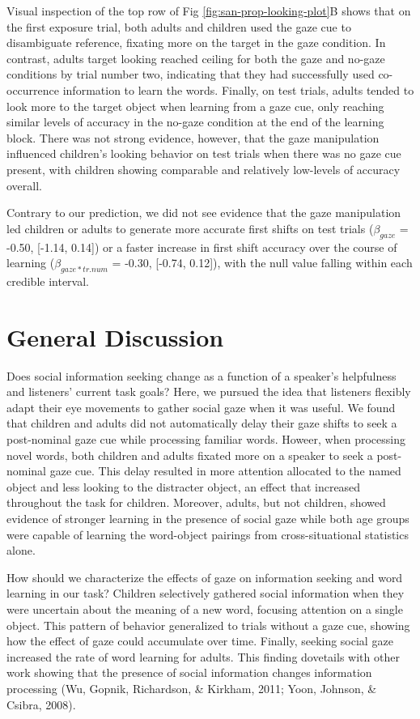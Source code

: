 \documentclass[10pt, letterpaper]{article}
\begin{document}
Visual inspection of the top row of Fig \ref{fig:san-prop-looking-plot}B
shows that on the first exposure trial, both adults and children used
the gaze cue to disambiguate reference, fixating more on the target in
the gaze condition. In contrast, adults target looking reached ceiling
for both the gaze and no-gaze conditions by trial number two, indicating
that they had successfully used co-occurrence information to learn the
words. Finally, on test trials, adults tended to look more to the target
object when learning from a gaze cue, only reaching similar levels of
accuracy in the no-gaze condition at the end of the learning block.
There was not strong evidence, however, that the gaze manipulation
influenced children's looking behavior on test trials when there was no
gaze cue present, with children showing comparable and relatively
low-levels of accuracy overall.

Contrary to our prediction, we did not see evidence that the gaze
manipulation led children or adults to generate more accurate first
shifts on test trials (\(\beta_{gaze}\) = -0.50, {[}-1.14, 0.14{]}) or a
faster increase in first shift accuracy over the course of learning
(\(\beta_{gaze*tr.num}\) = -0.30, {[}-0.74, 0.12{]}), with the null
value falling within each credible interval.

\hypertarget{general-discussion}{%
\section{General Discussion}\label{general-discussion}}

Does social information seeking change as a function of a speaker's
helpfulness and listeners' current task goals? Here, we pursued the idea
that listeners flexibly adapt their eye movements to gather social gaze
when it was useful. We found that children and adults did not
automatically delay their gaze shifts to seek a post-nominal gaze cue
while processing familiar words. Howeer, when processing novel words,
both children and adults fixated more on a speaker to seek a
post-nominal gaze cue. This delay resulted in more attention allocated
to the named object and less looking to the distracter object, an effect
that increased throughout the task for children. Moreover, adults, but
not children, showed evidence of stronger learning in the presence of
social gaze while both age groups were capable of learning the
word-object pairings from cross-situational statistics alone.

How should we characterize the effects of gaze on information seeking
and word learning in our task? Children selectively gathered social
information when they were uncertain about the meaning of a new word,
focusing attention on a single object. This pattern of behavior
generalized to trials without a gaze cue, showing how the effect of gaze
could accumulate over time. Finally, seeking social gaze increased the
rate of word learning for adults. This finding dovetails with other work
showing that the presence of social information changes information
processing (Wu, Gopnik, Richardson, \& Kirkham, 2011; Yoon, Johnson, \&
Csibra, 2008).
\end{document}
